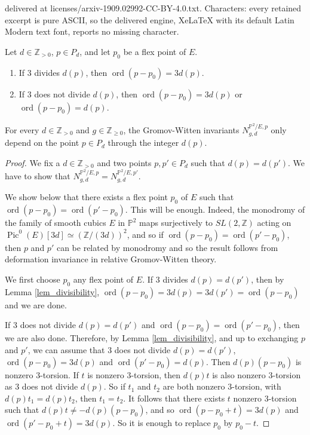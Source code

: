 \documentclass[10pt,a4paper]{amsart}
\newcommand\PP{\mathbb P}
\newcommand\Pic{\operatorname{Pic}}
\newcommand\Z{\mathbb Z}
\newcommand\ord{\operatorname{ord}}
\begin{document}
delivered at licenses/arxiv-1909.02992-CC-BY-4.0.txt. Characters: every retained excerpt is pure ASCII, so the delivered engine, XeLaTeX with its default Latin Modern text font, reports no missing character.
\begin{lem}\label{lem_divisibility}
Let $d \in \Z_{>0}$, $p \in P_d$, and let $p_0$ be a flex point of $E$.
\begin{enumerate}
    \item If $3$ divides $d(p)$, then $\ord(p-p_0)=3d(p)$.
    \item If $3$ does not divide $d(p)$, then 
    $\ord(p-p_0)=3d(p)$ or $\ord(p-p_0)=d(p)$.
\end{enumerate}
\end{lem}

\begin{lem} \label{lem_monodromy}
For every $d \in \Z_{>0}$
and $g\in \Z_{\geqslant 0}$, the 
Gromov-Witten invariants $N_{g,d}^{\PP^2/E,p}$ only depend on the point $p \in P_d$ through the integer $d(p)$. 
\end{lem}

\begin{proof}
We fix a $d \in \Z_{>0}$ and two points $p, p' \in P_d$
such that $d(p)=d(p')$. We have to show that 
$N_{g,d}^{\PP^2/E,p}=N_{g,d}^{\PP^2/E,p'}$.

We show below that there exists a flex point $p_0$ of $E$ such that $\ord(p-p_0)=\ord(p'-p_0)$.
This will be enough. Indeed, the monodromy of the family of smooth cubics $E$ in $\PP^2$ maps surjectively to $SL(2,\Z)$
acting on $\Pic^0(E)[3d] \simeq (\Z/(3d))^2$, and so if 
$\ord(p-p_0)=\ord(p'-p_0)$, then $p$ and $p'$ can be related by monodromy and so the result follows from deformation invariance in relative Gromov-Witten theory.

We first choose $p_0$ any flex point of $E$. If $3$ divides 
$d(p)=d(p')$, then by Lemma 
\ref{lem_divisibility}, $\ord(p-p_0)=3d(p)=3d(p')=\ord(p-p_0)$ and we are done.

If $3$ does not divide $d(p)=d(p')$ and $\ord(p-p_0)=\ord(p'-p_0)$, then we are also done.
Therefore, by Lemma \ref{lem_divisibility}, and up to exchanging $p$ and $p'$, we can assume that $3$ does not divide $d(p)=d(p')$,
$\ord(p-p_0)=3d(p)$ and $\ord(p'-p_0)=d(p)$.
Then $d(p)(p-p_0)$ is nonzero $3$-torsion.
If $t$ is nonzero $3$-torsion, then 
$d(p)t$ is also nonzero $3$-torsion as $3$ does not divide 
$d(p)$. So if $t_1$ and $t_2$ are both nonzero $3$-torsion,
with $d(p)t_1=d(p)t_2$, then $t_1=t_2$. It follows that there exists $t$ nonzero $3$-torsion such that $d(p)t \neq -d(p)(p-p_0)$, and so $\ord(p-p_0+t)=3d(p)$ and 
$\ord(p'-p_0+t)=3d(p)$. So it is enough to replace 
$p_0$ by $p_0-t$.
\end{proof}
\end{document}
